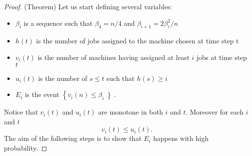 \begin{proof}(Theorem)
  Let us start defining several variables:
  \begin{itemize}
  \item $\beta_i$ is a sequence such that $\beta_4 = n / 4$ and
    $\beta_{i+1} = 2\beta_i^2 / n$
  \item $h(t)$ is the number of jobs assigned to the machine chosen
    at time step t
  \item $v_i(t)$ is the number of machines having assigned at least $i$
    jobs at time step $t$
  \item $u_i(t)$ is the number of $s \leq t$ such that $h(s) \geq i$
  \item $E_i$ is the event $\left\{v_i(n) \leq \beta_i\left\}$.
  \end{itemize}
  Notice that $v_i(t)$ and $u_i(t)$ are monotone in both $i$ and $t$. Moreover for each $i$ and $t$ $$v_i(t) \leq u_i(t).$$
  The aim of the following steps is to show that $E_i$ happens with high probability.
  

\end{proof}
